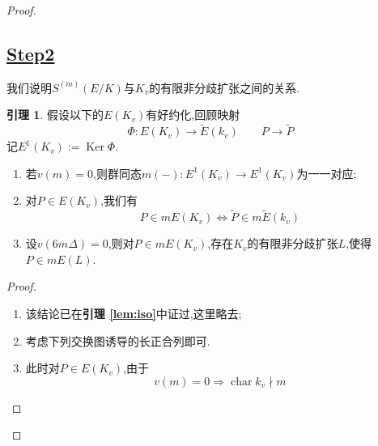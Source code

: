 \documentclass[12pt,A4paper,oneside,reqno]{amsart}
\numberwithin{equation}{section}
\theoremstyle{definition}
\newtheorem{lemma}[theorem]{引理}
\theoremstyle{plain}
\theoremstyle{plain}
\numberwithin{equation}{section}
\theoremstyle{remark}
\DeclareMathOperator{\cha}{\operatorname{char}}
\DeclareMathOperator{\Ker}{\operatorname{Ker}}
\begin{document}
\begin{proof}
\subsection*{\underline{Step2}}
我们说明$S^{(m)}(E/K)$与$K_v$的有限非分歧扩张之间的关系.
\begin{lemma}\label{lem:conexten}
	假设以下的$E(K_v)$有好约化,回顾映射
	$$\Phi:E(K_v) \longrightarrow \tilde{E}(k_v) \qquad P \longrightarrow \tilde{P}$$
	记$E^1(K_v):=\Ker \Phi$.
	\begin{enumerate}[1.]
		\item 若$v(m)=0$,则群同态$m(-): E^1(K_v)\longrightarrow E^1(K_v)$为一一对应;
		\item \label{item:reducetok} 
		对$P \in E(K_v)$,我们有
		$$P \in mE(K_v) \Longleftrightarrow \tilde{P} \in  m\tilde{E}(k_v) $$
		\item \label{item:findextension}设$v(6m\Delta)=0$,则对$P \in mE(K_v)$,存在$K_v$的有限非分歧扩张$L$,使得$P \in mE(L)$.
	\end{enumerate}
\end{lemma}
\begin{proof}
	\begin{enumerate}[1.]
		\item 该结论已在\textbf{引理 \ref{lem:iso}}中证过,这里略去;
		\item 考虑下列交换图诱导的长正合列即可.
			\begin{center}
		\end{center}
		\item 此时对$P \in E(K_v)$,由于
		$$v(m)=0 \Longrightarrow \cha k_v \nmid m$$

\end{enumerate}
\end{proof}
\end{proof}
\end{document}
